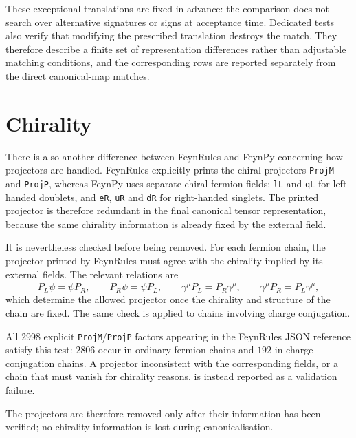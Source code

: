 These exceptional translations are fixed in advance: the comparison does not search over alternative signatures or signs at acceptance time. Dedicated tests also verify that modifying the prescribed translation destroys the match. They therefore describe a finite set of representation differences rather than adjustable matching conditions, and the corresponding rows are reported separately from the direct canonical-map matches.


\section{Chirality}
\label{sec:validation-chirality}

There is also another difference between FeynRules and FeynPy concerning how projectors are handled. FeynRules explicitly prints the chiral projectors \texttt{ProjM} and \texttt{ProjP}, whereas FeynPy uses separate chiral fermion fields: \texttt{lL} and \texttt{qL} for left-handed doublets, and \texttt{eR}, \texttt{uR} and \texttt{dR} for right-handed singlets. The printed projector is therefore redundant in the final canonical tensor representation, because the same chirality information is already fixed by the external field.

It is nevertheless checked before being removed. For each fermion chain, the projector printed by FeynRules must agree with the chirality implied by its external fields. The relevant relations are
\begin{equation}
    \overline{P_L\psi}=\bar\psi P_R,
    \qquad
    \overline{P_R\psi}=\bar\psi P_L,
    \qquad
    \gamma^\mu P_L=P_R\gamma^\mu,
    \qquad
    \gamma^\mu P_R=P_L\gamma^\mu,
\end{equation}
which determine the allowed projector once the chirality and structure of the chain are fixed. The same check is applied to chains involving charge conjugation.

All $2998$ explicit \texttt{ProjM}/\texttt{ProjP} factors appearing in the FeynRules JSON reference satisfy this test: $2806$ occur in ordinary fermion chains and $192$ in charge-conjugation chains. A projector inconsistent with the corresponding fields, or a chain that must vanish for chirality reasons, is instead reported as a validation failure.

The projectors are therefore removed only after their information has been verified; no chirality information is lost during canonicalisation.


